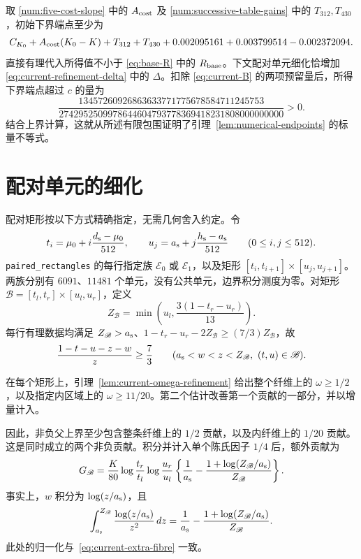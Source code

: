 取 \eqref{num:five-cost-slope} 中的 $A_{\rm cost}$ 及 \eqref{num:successive-table-gains} 中的 $T_{312},T_{430}$，初始下界端点至少为
\begin{equation}
 C_{K_0}+A_{\rm cost}(K_0-K)+T_{312}+T_{430}
 +0.002095161+0.003799514-0.002372094.
 \label{num:lower-sum}
\end{equation}
直接有理代入所得值不小于 \eqref{eq:base-R} 中的 $R_{\rm base}$。下文配对单元细化恰增加 \eqref{eq:current-refinement-delta} 中的 $\Delta$。扣除 \eqref{eq:current-B} 的两项预留量后，所得下界端点超过 $c$ 的量为
\[
 \frac{13457260926863633771775678584711245753}
 {2742952509978644604793778369418231808000000000}>0.
\]
结合上界计算，这就从所述有限包围证明了引理~\ref{lem:numerical-endpoints} 的标量不等式。

\section{配对单元的细化}\label{app:refinement}

配对矩形按以下方式精确指定，无需几何舍入约定。令
\[
 t_i=\mu_0+i\frac{{d_{\rm s}}-\mu_0}{512},\qquad
 u_j={a_{\rm s}}+j\frac{{h_{\rm s}}-{a_{\rm s}}}{512}\qquad(0\le i,j\le512).
\]
\texttt{paired\_rectangles} 的每行指定族 $\mathscr E_0$ 或 $\mathscr E_1$，以及矩形 $[t_i,t_{i+1}]\times[u_j,u_{j+1}]$。两族分别有 $6091$、$11481$ 个单元，没有公共单元，边界积分测度为零。对矩形 $\mathscr B=[t_l,t_r]\times[u_l,u_r]$，定义
\[
 Z_{\mathscr B}=\min\left(u_l,\frac{3(1-t_r-u_r)}{13}\right).
\]
每行有理数据均满足 $Z_{\mathscr B}>{a_{\rm s}}$、$1-t_r-u_r-2Z_{\mathscr B}\ge(7/3)Z_{\mathscr B}$，故
\[
 \frac{1-t-u-z-w}{z}\ge\frac73
 \qquad({a_{\rm s}}<w<z<Z_{\mathscr B},\ (t,u)\in \mathscr B).
\]

在每个矩形上，引理~\ref{lem:current-omega-refinement} 给出整个纤维上的 $\omega\ge1/2$，以及指定内区域上的 $\omega\ge11/20$。第二个估计改善第一个贡献的一部分，并以增量计入。

因此，非负父上界至少包含整条纤维上的 $1/2$ 贡献，以及内纤维上的 $1/20$ 贡献。这是同时成立的两个非负贡献。积分并计入单个陈氏因子 $1/4$ 后，额外贡献为
\begin{equation}
 G_{\mathscr B}=\frac K{80}\log\frac{t_r}{t_l}\log\frac{u_r}{u_l}
 \left\{\frac1{a_{\rm s}}-\frac{1+\log(Z_{\mathscr B}/{a_{\rm s}})}{Z_{\mathscr B}}\right\}.
 \label{num:paired-extra}
\end{equation}
事实上，$w$ 积分为 $\log(z/{a_{\rm s}})$，且
\[
 \int_{a_{\rm s}}^{Z_{\mathscr B}}\frac{\log(z/{a_{\rm s}})}{z^2}\,dz
 =\frac1{a_{\rm s}}-\frac{1+\log(Z_{\mathscr B}/{a_{\rm s}})}{Z_{\mathscr B}}.
\]
此处的归一化与~\eqref{eq:current-extra-fibre} 一致。


